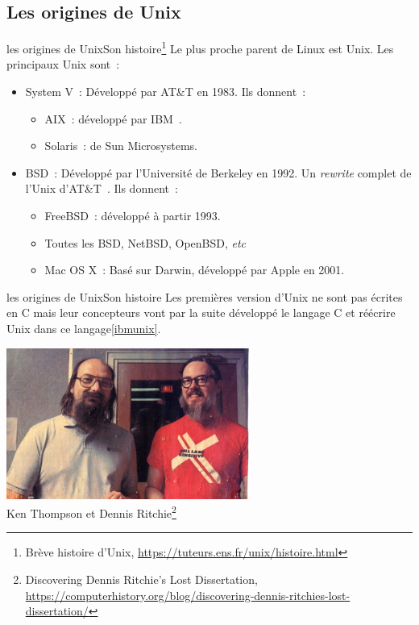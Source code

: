 \documentclass{beamer}
\begin{document}
    \subsection{Les origines de Unix}\label{subsec:unix-derivatives}
    \begin{frame}{les origines de Unix}{Son histoire\footnote{Brève histoire d'Unix, \url{https://tuteurs.ens.fr/unix/histoire.html}}}
        Le plus proche parent de Linux est Unix.
        Les principaux Unix sont~:
        \begin{itemize}
            \item System V~: Développé par AT\&T en 1983.
            Ils donnent~:
            \begin{itemize}
                \item AIX~: développé par IBM~.
                \item Solaris~: de Sun Microsystems.
            \end{itemize}
            \item BSD~: Développé par l'Université de Berkeley en 1992.
            Un \textit{rewrite} complet de l'Unix d'AT\&T~.
            Ils donnent~:
            \begin{itemize}
                \item FreeBSD~: développé à partir 1993.
                \item Toutes les BSD, NetBSD, OpenBSD, \textit{etc}
                \item Mac OS X~: Basé sur Darwin, développé par Apple en 2001.
            \end{itemize}
        \end{itemize}
    \end{frame}

    \begin{frame}{les origines de Unix}{Son histoire}
        Les premières version d'Unix ne sont pas écrites en C mais leur concepteurs vont par la suite développé le langage C et réécrire Unix dans ce langage\cref{ibmunix}.
        \begin{center}
            \includegraphics[width=8cm]{image/thompson-rithcie-bell} \\ Ken Thompson et Dennis Ritchie\footnote{Discovering Dennis Ritchie’s Lost Dissertation, \url{https://computerhistory.org/blog/discovering-dennis-ritchies-lost-dissertation/}} \\
        \end{center}
    \end{frame}
\end{document}
